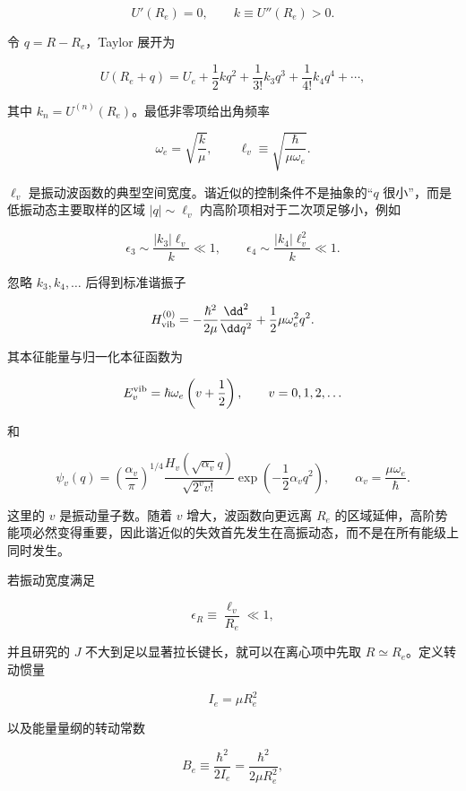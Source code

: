 \[
U'(R_e)=0,
\qquad
k\equiv U''(R_e)>0.
\]

令 \(q=R-R_e\)，Taylor 展开为

\begin{equation}
U(R_e+q)
=U_e+\frac12kq^2
+\frac1{3!}k_3q^3
+\frac1{4!}k_4q^4+\cdots,
\label{eq:diatomic-potential-expansion}
\end{equation}

其中 \(k_n=U^{(n)}(R_e)\)。最低非零项给出角频率

\begin{equation}
\omega_e=\sqrt{\frac{k}{\mu}},
\qquad
\ell_v\equiv\sqrt{\frac{\hbar}{\mu\omega_e}}.
\label{eq:diatomic-vibrational-scale}
\end{equation}

\(\ell_v\) 是振动波函数的典型空间宽度。谐近似的控制条件不是抽象的“\(q\) 很小”，而是低振动态主要取样的区域 \(|q|\sim\ell_v\) 内高阶项相对于二次项足够小，例如

\[
\epsilon_3
\sim\frac{|k_3|\ell_v}{k}\ll1,
\qquad
\epsilon_4
\sim\frac{|k_4|\ell_v^2}{k}\ll1.
\]

忽略 \(k_3,k_4,\ldots\) 后得到标准谐振子

\[
H_{\rm vib}^{(0)}
=-\frac{\hbar^2}{2\mu}\frac{\dd^2}{\dd q^2}
+\frac12\mu\omega_e^2q^2.
\]

其本征能量与归一化本征函数为

\begin{equation}
E_v^{\rm vib}
=\hbar\omega_e\left(v+\frac12\right),
\qquad
v=0,1,2,\ldots
\label{eq:diatomic-harmonic-levels}
\end{equation}

和

\[
\psi_v(q)
=\left(\frac{\alpha_v}{\pi}\right)^{1/4}
\frac{H_v(\sqrt{\alpha_v}q)}{\sqrt{2^vv!}}
\exp\!\left(-\frac12\alpha_vq^2\right),
\qquad
\alpha_v=\frac{\mu\omega_e}{\hbar}.
\]

这里的 \(v\) 是振动量子数。随着 \(v\) 增大，波函数向更远离 \(R_e\) 的区域延伸，高阶势能项必然变得重要，因此谐近似的失效首先发生在高振动态，而不是在所有能级上同时发生。

若振动宽度满足

\[
\epsilon_R\equiv\frac{\ell_v}{R_e}\ll1,
\]

并且研究的 \(J\) 不大到足以显著拉长键长，就可以在离心项中先取 \(R\simeq R_e\)。定义转动惯量

\[
I_e=\mu R_e^2
\]

以及能量量纲的转动常数

\begin{equation}
B_e\equiv\frac{\hbar^2}{2I_e}
=\frac{\hbar^2}{2\mu R_e^2},
\label{eq:diatomic-rotational-constant}
\end{equation}

